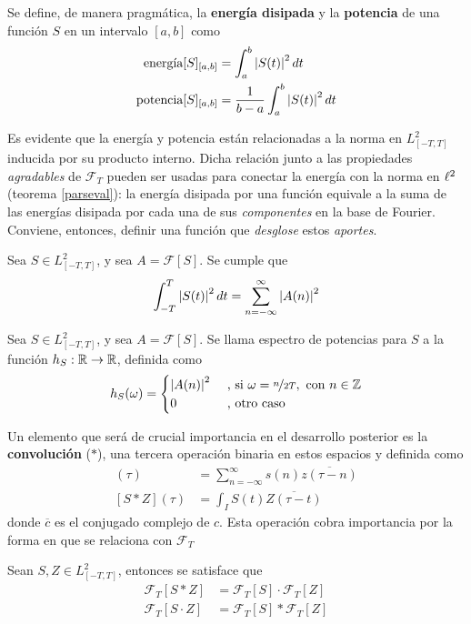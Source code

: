 Se define, de manera pragmática, la \textbf{energía disipada} y la \textbf{potencia} de una función 
$S$ en un intervalo $[a,b]$ como 
\begin{align}
\text{energía}[S]_{[a,b]} &= \int_a^{b} \left| S(t) \right|^{2} dt \nonumber \\
\text{potencia}[S]_{[a,b]} &= \frac{1}{b-a} \int_a^{b} \left| S(t) \right|^{2} dt
\label{energia}
\end{align}

Es evidente que la energía y potencia están relacionadas a la norma en $L^{2}_{[-T,T]}$ inducida por
su producto interno.
%
Dicha relación junto a las propiedades \textit{agradables} de $\mathcal{F}_T$ pueden ser usadas 
para conectar la energía con la norma en $\ell^{2}$ (teorema \ref{parseval}): la energía disipada por 
una función equivale a la suma de las energías disipada por cada una de sus \textit{componentes} en 
la base de Fourier.
%
Conviene, entonces, definir una función que \textit{desglose} estos \textit{aportes}.

\begin{teorema}[Parseval]
Sea $S \in L^{2}_{[-T,T]}$, y sea $A = \mathcal{F}[S]$. Se cumple que
\begin{equation*}
\int_{-T}^{T} \left| S(t) \right|^{2} dt = \sum_{n=-\infty}^{\infty} \left| A(n) \right|^{2}
\end{equation*}
\label{parseval}
\end{teorema}

\begin{definicion}
Sea $S \in L^{2}_{[-T,T]}$, y sea $A = \mathcal{F}[S]$. Se llama espectro de potencias 
para $S$ a la función $h_S : \mathbb{R} \rightarrow \mathbb{R} $, definida como
\begin{equation*}
h_S(\omega) = 
\begin{cases}
\left| A(n) \right|^{2} & \text{ , si } \omega = \nicefrac{n}{2T}, \text{   con } n\in \mathbb{Z} \\
0 & \text{ ,  otro caso}
\end{cases}
\end{equation*}
\label{espec}
\end{definicion}

Un elemento que será de crucial importancia en el desarrollo posterior es la \textbf{convolución} 
($\ast$), una tercera operación binaria en estos espacios y definida como
%
\begin{align*}
[s \ast z] (\tau) &= \sum_{n=-\infty}^{\infty} s(n) \overline{z(\tau-n)} \\
[S \ast Z] (\tau) &= \int_I S(t) \overline{Z(\tau-t)}
\end{align*}
%
donde $\overline{c}$ es el conjugado complejo de $c$. 
%
Esta operación cobra importancia por la forma en que se relaciona con $\mathcal{F}_T$
%
\begin{observacion}%
Sean $S,Z \in L^{2}_{[-T,T]}$, entonces se satisface que
\begin{align*}
\mathcal{F}_T[S\ast Z]  &= \mathcal{F}_T[S] \cdot \mathcal{F}_T[Z] \\
\mathcal{F}_T[S\cdot Z] &= \mathcal{F}_T[S] \ast  \mathcal{F}_T[Z] 
\end{align*}
\label{t_convolucion}
\end{observacion}

